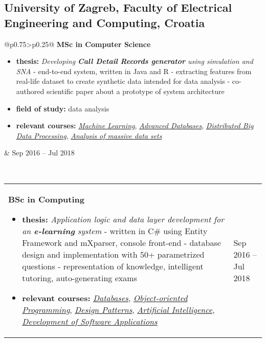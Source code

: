 \documentclass[a4paper]{article}
\makeatletter
\newlength{\tablewidth}
\newenvironment{period}[2]{%
\newcommand{\sarma}{#2}%
\setlength{\tablewidth}{\linewidth}
\addtolength{\tablewidth}{-2\tabcolsep}
\begin{tabular}{@{}p{0.75\tablewidth}>{\raggedleft\arraybackslash}p{0.25\tablewidth}@{}}%
#1 \newline
\begin{itemize}
}{%
\end{itemize} & \sarma \\%
\end{tabular}\\
}
\makeatother
\begin{document}
\subsection{University of Zagreb, Faculty of Electrical Engineering and Computing, Croatia}
\begin{period}{\textbf{MSc in Computer Science}}{Sep 2016 -- Jul 2018}
    \item \textbf{thesis:}
        \textit{Developing \textbf{Call Detail Records generator} using simulation and SNA}
        \newline - end-to-end system, written in Java and R
        \newline - extracting features from real-life dataset to create synthetic data intended for data analysis
        \newline - co-authored scientific paper about a prototype of system architecture
    \item \textbf{field of study:}
        data analysis
    \item \textbf{relevant courses:}
	    \textit{\href{%
	    	}{Machine Learning}},
	    \textit{\href{%
	    	}{Advanced Databases}},
	    \textit{\href{%
	    	}{Distributed Big Data Processing}},
	    \textit{\href{%
	    	}{Analysis of massive data sets}}
\end{period}
\begin{period}{\textbf{BSc in Computing}}{Sep 2013 -- Jul 2016}
    \item \textbf{thesis:}
        \textit{Application logic and data layer development for an \textbf{e-learning} system}
        \newline - written in C\# using Entity Framework and mXparser, console front-end 
        \newline - database design and implementation with 50+ parametrized questions
        \newline - representation of knowledge, intelligent tutoring, auto-generating exams
        
    \item \textbf{relevant courses:}
	    \textit{\href{%
	    		}{Databases}},
		\textit{\href{%
				}{Object-oriented Programming}},
		\textit{\href{%
			}{Design Patterns}},
		\textit{\href{%
				}{Artificial Intelligence}},
		\textit{\href{%
				}{Development of Software Applications}}
		
\end{period}
\end{document}
